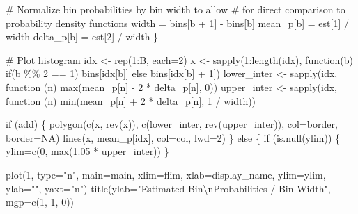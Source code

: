 \documentclass[
  letterpaper,
  DIV=11,
  numbers=noendperiod]{scrartcl}
\newenvironment{Shaded}{\begin{snugshade}}{\end{snugshade}}
\newcommand{\BuiltInTok}[1]{\textcolor[rgb]{0.00,0.23,0.31}{#1}}
\newcommand{\CharTok}[1]{\textcolor[rgb]{0.13,0.47,0.30}{#1}}
\newcommand{\CommentTok}[1]{\textcolor[rgb]{0.37,0.37,0.37}{#1}}
\newcommand{\ControlFlowTok}[1]{\textcolor[rgb]{0.00,0.23,0.31}{#1}}
\newcommand{\DecValTok}[1]{\textcolor[rgb]{0.68,0.00,0.00}{#1}}
\newcommand{\FloatTok}[1]{\textcolor[rgb]{0.68,0.00,0.00}{#1}}
\newcommand{\KeywordTok}[1]{\textcolor[rgb]{0.00,0.23,0.31}{#1}}
\newcommand{\NormalTok}[1]{\textcolor[rgb]{0.00,0.23,0.31}{#1}}
\newcommand{\OperatorTok}[1]{\textcolor[rgb]{0.37,0.37,0.37}{#1}}
\newcommand{\StringTok}[1]{\textcolor[rgb]{0.13,0.47,0.30}{#1}}
\begin{document}
\begin{Shaded}
\begin{Highlighting}[]
    \CommentTok{\# Normalize bin probabilities by bin width to allow}
    \CommentTok{\# for direct comparison to probability density functions}
\NormalTok{    width }\OperatorTok{=}\NormalTok{ bins[b }\OperatorTok{+} \DecValTok{1}\NormalTok{] }\OperatorTok{{-}}\NormalTok{ bins[b]}
\NormalTok{    mean\_p[b] }\OperatorTok{=}\NormalTok{ est[}\DecValTok{1}\NormalTok{] }\OperatorTok{/}\NormalTok{ width}
\NormalTok{    delta\_p[b] }\OperatorTok{=}\NormalTok{ est[}\DecValTok{2}\NormalTok{] }\OperatorTok{/}\NormalTok{ width}
\NormalTok{  \}}

  \CommentTok{\# Plot histogram}
\NormalTok{  idx }\OperatorTok{\textless{}{-}}\NormalTok{ rep(}\DecValTok{1}\NormalTok{:B, each}\OperatorTok{=}\DecValTok{2}\NormalTok{)}
\NormalTok{  x }\OperatorTok{\textless{}{-}}\NormalTok{ sapply(}\DecValTok{1}\NormalTok{:length(idx), function(b) }\ControlFlowTok{if}\NormalTok{(b }\OperatorTok{\%\%} \DecValTok{2} \OperatorTok{==} \DecValTok{1}\NormalTok{) bins[idx[b]]}
              \ControlFlowTok{else}\NormalTok{ bins[idx[b] }\OperatorTok{+} \DecValTok{1}\NormalTok{])}
\NormalTok{  lower\_inter }\OperatorTok{\textless{}{-}}\NormalTok{ sapply(idx, function (n)}
    \BuiltInTok{max}\NormalTok{(mean\_p[n] }\OperatorTok{{-}} \DecValTok{2} \OperatorTok{*}\NormalTok{ delta\_p[n], }\DecValTok{0}\NormalTok{))}
\NormalTok{  upper\_inter }\OperatorTok{\textless{}{-}}\NormalTok{ sapply(idx, function (n)}
    \BuiltInTok{min}\NormalTok{(mean\_p[n] }\OperatorTok{+} \DecValTok{2} \OperatorTok{*}\NormalTok{ delta\_p[n], }\DecValTok{1} \OperatorTok{/}\NormalTok{ width))}

  \ControlFlowTok{if}\NormalTok{ (add) \{}
\NormalTok{    polygon(c(x, rev(x)), c(lower\_inter, rev(upper\_inter)),}
\NormalTok{            col}\OperatorTok{=}\NormalTok{border, border}\OperatorTok{=}\NormalTok{NA)}
\NormalTok{    lines(x, mean\_p[idx], col}\OperatorTok{=}\NormalTok{col, lwd}\OperatorTok{=}\DecValTok{2}\NormalTok{)}
\NormalTok{  \} }\ControlFlowTok{else}\NormalTok{ \{}
    \ControlFlowTok{if}\NormalTok{ (}\KeywordTok{is}\NormalTok{.null(ylim)) \{}
\NormalTok{      ylim}\OperatorTok{=}\NormalTok{c(}\DecValTok{0}\NormalTok{, }\BuiltInTok{max}\NormalTok{(}\FloatTok{1.05} \OperatorTok{*}\NormalTok{ upper\_inter))}
\NormalTok{    \}}

\NormalTok{    plot(}\DecValTok{1}\NormalTok{, }\BuiltInTok{type}\OperatorTok{=}\StringTok{"n"}\NormalTok{, main}\OperatorTok{=}\NormalTok{main,}
\NormalTok{         xlim}\OperatorTok{=}\NormalTok{flim, xlab}\OperatorTok{=}\NormalTok{display\_name,}
\NormalTok{         ylim}\OperatorTok{=}\NormalTok{ylim, ylab}\OperatorTok{=}\StringTok{""}\NormalTok{, yaxt}\OperatorTok{=}\StringTok{"n"}\NormalTok{)}
\NormalTok{    title(ylab}\OperatorTok{=}\StringTok{"Estimated Bin}\CharTok{\textbackslash{}n}\StringTok{Probabilities / Bin Width"}\NormalTok{,}
\NormalTok{          mgp}\OperatorTok{=}\NormalTok{c(}\DecValTok{1}\NormalTok{, }\DecValTok{1}\NormalTok{, }\DecValTok{0}\NormalTok{))}


\end{Highlighting}
\end{Shaded}
\end{document}
